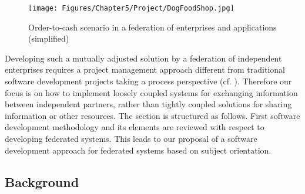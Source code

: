 \begin{figure}[htbp]
	\centering
	\texttt{[image: Figures/Chapter5/Project/DogFoodShop.jpg]}
	\caption[Order-to-cash scenario in a federation of enterprises and applications (simplified)]{Order-to-cash scenario in a federation of enterprises and applications (simplified)}
	\label{fig:DogFoodShop}
\end{figure}

Developing such a mutually adjusted solution by a federation of independent enterprises requires a project management approach different from traditional software development projects taking a process perspective (cf. \cite{book:ProjectHistory}). Therefore our focus is on how to implement loosely coupled systems for exchanging information between independent partners, rather than tightly coupled solutions for sharing information or other resources.
The section is structured as follows. First software development methodology and its elements are reviewed with respect to developing federated systems. This leads to our proposal of a software development approach for federated systems based on subject orientation.
\\
\subsection{Background}

